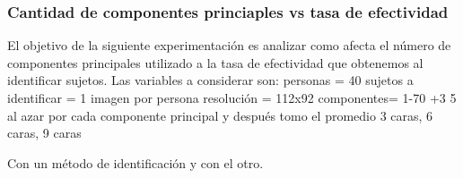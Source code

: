 \subsubsection{Cantidad de componentes princiaples vs tasa de efectividad}
El objetivo de la siguiente experimentación es analizar como afecta el n\'umero de componentes principales utilizado a la tasa de efectividad
que obtenemos al identificar sujetos. Las variables a considerar son: 
personas = 40
sujetos a identificar = 1 imagen por persona
resolución = 112x92
componentes= 1-70 +3
5 al azar por cada componente principal y después tomo el promedio
3 caras, 6 caras, 9 caras

Con un método de identificación y con el otro.